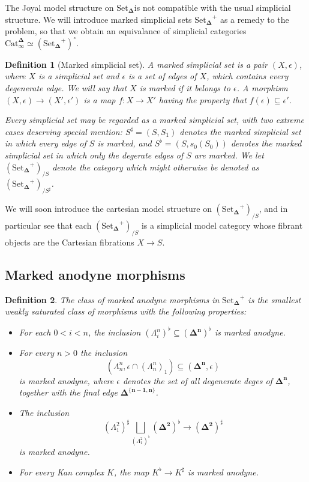 \documentclass[12pt]{amsart}
\newcommand{\8}{\ensuremath{\infty}}
\newcommand{\Horn}[2]{\ensuremath{\Lambda^{#1}_{#2}}}
\newcommand{\Simplex}[1][n]{\ensuremath{\boldsymbol{\Delta^{#1}}}}
\newcommand{\SSet}{\ensuremath{\text{Set}_{\boldsymbol{\Delta}}}}
\newcommand{\Catinfdel}{\ensuremath{\text{Cat}^{\boldsymbol{\Delta}}_{\infty}}}
\newtheorem{definition}{Definition}
\begin{document}
The Joyal model structure on \SSet is not compatible with the usual simplicial structure. We will introduce marked simplicial sets $\SSet^+$ as a remedy to the problem, so that we obtain an equivalance of simplicial categories $\Catinfdel \simeq (\SSet^+)^\circ$.

\begin{definition}[Marked simplicial set]
  A marked simplicial set is a pair $(X, \epsilon)$, where $X$ is a simplicial set and $\epsilon$ is a set of edges of $X$, which contains every degenerate edge. We will say that $X$ is marked if it belongs to $\epsilon$. A morphism $(X, \epsilon) \rightarrow (X', \epsilon')$ is a map $f : X \rightarrow X'$ having the property that $f(\epsilon) \subseteq \epsilon'$.

  Every simplicial set may be regarded as a marked simplicial set, with two extreme cases deserving special mention: $S^\sharp = (S, S_1)$ denotes the marked simplicial set in which every edge of $S$ is marked, and $S^\flat = (S, s_0(S_0))$ denotes the marked simplicial set in which only the degerate edges of $S$ are marked. We let $(\SSet^+)_{/S}$ denote the category which might otherwise be denoted as $(\SSet^+)_{/S^\sharp}$.
\end{definition}

We will soon introduce the cartesian model structure on $(\SSet^+)_{/S}$, and in particular see that each $(\SSet^+)_{/S}$ is a simplicial model category whose fibrant objects are the Cartesian fibrations $X \rightarrow S$.

\subsection{Marked anodyne morphisms}

\begin{definition}
  The class of marked anodyne morphisms in $\SSet^+$ is the smallest weakly saturated class of morphisms with the following properties:

  \begin{itemize}
    \item For each $0 < i < n$, the inclusion $(\Horn{n}{i})^\flat \subseteq (\Simplex)^\flat$ is marked anodyne.
    \item For every $n > 0$ the inclusion
          $$
            (\Horn{n}{n}, \epsilon \cap (\Horn{n}{n})_1) \subseteq (\Simplex, \epsilon)
          $$
          is marked anodyne, where $\epsilon$ denotes the set of all degenerate deges of \Simplex, together with the final edge \Simplex[\{n - 1, n\}].
    \item The inclusion
          $$
            (\Horn{2}{1})^\sharp \bigsqcup_{(\Horn{2}{1})^\flat} (\Simplex[2])^\flat \rightarrow (\Simplex[2])^\sharp
          $$
          is marked anodyne.
    \item For every Kan complex $K$, the map $K^\flat \rightarrow K^\sharp$ is marked anodyne.
  \end{itemize}
\end{definition}
\end{document}
